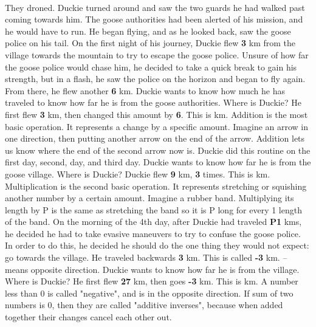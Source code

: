 \paragraph{} They droned. Duckie turned around and saw the two guards he had walked past coming towards him. The goose authorities had been alerted of his mission, and he would have to run. He began flying, and as he looked back, saw the goose police on his tail. 
\vfill
\pagebreak
{On the first night of his journey, Duckie flew \textbf{3} km from the village towards the mountain to try to escape the goose police. Unsure of how far the goose police would chase him, he decided to take a quick break to gain his strength, but in a flash, he saw the police on the horizon and began to fly again. From there, he flew another \textbf{6} km. Duckie wants to know how much he has traveled to know how far he is from the goose authorities. Where is Duckie?}
{He first flew \textbf{3} km, then changed this amount by \textbf{6}. This is  km.}
{Addition is the most basic operation. It represents a change by a specific amount. Imagine an arrow in one direction, then putting another arrow on the end of the arrow. Addition lets us know where the end of the second arrow now is.} 
{}
{Duckie did this routine on the first day, second, day, and third day.  Duckie wants to know how far he is from the goose village. Where is Duckie?}
{Duckie flew \textbf{9} km, \textbf{3} times. This is  km.}
{Multiplication is the second basic operation. It represents stretching or squishing another number by a certain amount. Imagine a rubber band. Multiplying its length by P is the same as stretching the band so it is P long for every 1 length of the band.}
{}
{On the morning of the 4th day, after Duckie had traveled \textbf{P1} kms, he decided he had to take evasive maneuvers to try to confuse the goose police. In order to do this, he decided he should do the one thing they would not expect: go towards the village. He traveled backwards \textbf{3} km. This is called \textbf{-3} km. \linebreak – means opposite direction. Duckie wants to know how far he is from the village. Where is Duckie?}
{He first flew \textbf{27} km, then goes \textbf{-3} km. This is  km.}
{A number less than 0 is called "negative", and is in the opposite direction. If sum of two numbers is 0, then they are called "additive inverses", because when added together their changes cancel each other out.}
